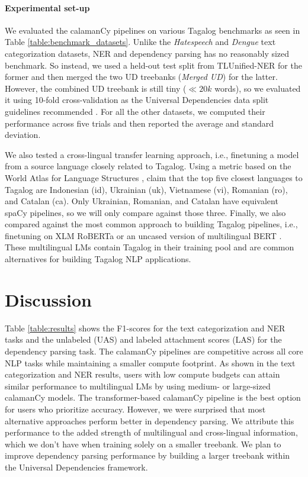 \documentclass[11pt]{article}
\begin{document}
\paragraph*{Experimental set-up} 
We evaluated the calamanCy pipelines on various Tagalog benchmarks as seen in Table \ref{table:benchmark_datasets}.
Unlike the \textit{Hatespeech} and \textit{Dengue} text categorization datasets, NER and dependency parsing has no reasonably sized benchmark.
So instead, we used a held-out test split from TLUnified-NER for the former and then merged the two UD treebanks (\textit{Merged UD}) for the latter. 
However, the combined UD treebank is still tiny ($\ll 20k$ words), so we evaluated it using 10-fold cross-validation as the Universal Dependencies data split guidelines recommended \citep{Nivre2020UniversalDV}.
For all the other datasets, we computed their performance across five trials and then reported the average and standard deviation.

We also tested a cross-lingual transfer learning approach, i.e., finetuning a model from a source language closely related to Tagalog.
Using a metric based on the World Atlas for Language Structures \citep{Haspelmath2005WALS,Agic2017CrossLingualPS}, \citet{Aquino2020ParsingIT} claim that the top five closest languages to Tagalog are Indonesian (id), Ukrainian (uk), Vietnamese (vi), Romanian (ro), and Catalan (ca).
Only Ukrainian, Romanian, and Catalan have equivalent spaCy pipelines, so we will only compare against those three.
Finally, we also compared against the most common approach to building Tagalog pipelines, i.e., finetuning on XLM RoBERTa \citep{Conneau2019UnsupervisedCR} or an uncased version of multilingual BERT \citep{Devlin2019BERTPO}.
These multilingual LMs contain Tagalog in their training pool and are common alternatives for building Tagalog NLP applications.

\section{Discussion}

Table \ref{table:results} shows the F1-scores for the text categorization and NER tasks and the unlabeled (UAS) and labeled attachment scores (LAS) for the dependency parsing task.
The calamanCy pipelines are competitive across all core NLP tasks while maintaining a smaller compute footprint.
As shown in the text categorization and NER results, users with low compute budgets can attain similar performance to multilingual LMs by using medium- or large-sized calamanCy models.
The transformer-based calamanCy pipeline is the best option for users who prioritize accuracy.
However, we were surprised that most alternative approaches perform better in dependency parsing.
We attribute this performance to the added strength of multilingual and cross-lingual information, which we don't have when training solely on a smaller treebank.
We plan to improve dependency parsing performance by building a larger treebank within the Universal Dependencies framework.
\end{document}

